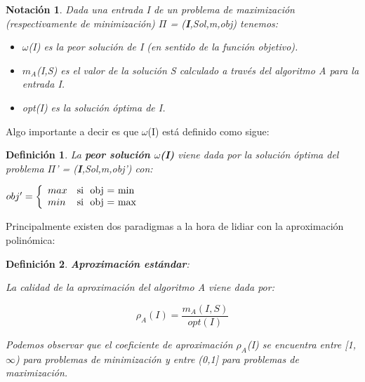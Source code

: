 \documentclass[a4paper,12pt,titlepage]{article}
\newtheorem{defi}{Definici\'on}[section]
\newtheorem*{nota}{Notaci\'on}
\begin{document}
\begin{nota}

Dada una entrada I de un problema de maximizaci\'on (respectivamente de minimizaci\'on) $\Pi$ = (\textbf{I},Sol,m,obj) tenemos:

\begin{itemize}

\item $\omega$(I) es la peor soluci\'on de I (en sentido de la funci\'on objetivo).

\item $m_A$(I,S) es el valor de la soluci\'on S calculado a trav\'es del algoritmo A para la entrada I.

\item opt(I) es la soluci\'on \'optima de I.

\end{itemize}

\end{nota}

Algo importante a decir es que $\omega$(I) est\'a definido como sigue:

\begin{defi}

La \textbf{peor soluci\'on $\omega$(I)} viene dada por la soluci\'on \'optima del problema $\Pi$' = (\textbf{I},Sol,m,obj') con:

\begin{center}

$ obj' = \left \lbrace
\begin{array}{l l}
max & \mbox{si }\mbox{ obj = min} \\
min & \mbox{si }\mbox{ obj = max}
\end{array}
\right. $

\end{center}

\end{defi}

Principalmente existen dos paradigmas a la hora de lidiar con la aproximaci\'on polin\'omica:

\begin{defi}

\textbf{Aproximaci\'on est\'andar}:

La calidad de la aproximaci\'on del algoritmo A viene dada por:

\begin{equation}
\rho_{A}(I)=\frac{m_{A}(I,S)}{opt(I)}
\end{equation}

Podemos observar que el coeficiente de aproximaci\'on $\rho_{A}$(I) se encuentra entre [1,$\infty$) para problemas de minimizaci\'on y entre (0,1] para problemas de maximizaci\'on.

\end{defi}
\end{document}
